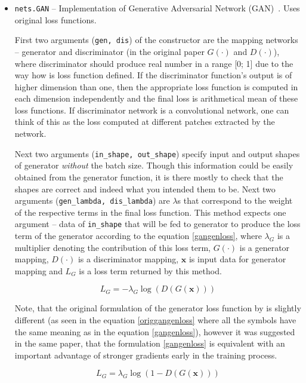 \begin{itemize}
\item \texttt{nets.GAN} -- Implementation of Generative Adversarial Network (GAN)~\cite{origgan}. Uses original loss functions.

\begin{description}
 First two arguments (\texttt{gen, dis}) of the constructor are the mapping networks -- generator and discriminator (in the original paper $G(\cdot)$ and $D(\cdot)$), where discriminator should produce real number in a range [0; 1] due to the way how is loss function defined. If the discriminator function's output is of higher dimension than one, then the appropriate loss function is computed in each dimension independently and the final loss is arithmetical mean of these loss functions. If discriminator network is a convolutional network, one can think of this as the loss computed at different patches extracted by the network.

Next two arguments (\texttt{in\_shape, out\_shape}) specify input and output shapes of generator {\em without} the batch size. Though this information could be easily obtained from the generator function, it is there mostly to check that the shapes are correct and indeed what you intended them to be. Next two arguments (\texttt{gen\_lambda, dis\_lambda}) are $\lambda$s that correspond to the weight of the respective terms in the final loss function.
 This method expects one argument -- data of \texttt{in\_shape} that will be fed to generator to produce the loss term of the generator according to the equation \ref{gangenloss}, where $\lambda_G$ is a multiplier denoting the contribution of this loss term, $G(\cdot)$ is a generator mapping, $D(\cdot)$ is a discriminator mapping, $\bm{x}$ is input data for generator mapping and $L_{G}$ is a loss term returned by this method.

\begin{equation}
L_{G} = -\lambda_G\log(D(G(\bm{x})))
\label{gangenloss}
\end{equation}

Note, that the original formulation of the generator loss function by \cite{origgan} is slightly different (as seen in the equation \ref{origgangenloss} where all the symbols have the same meaning as in the equation \ref{gangenloss}), however it was suggested in the same paper, that the formulation \ref{gangenloss} is equivalent with an important advantage of stronger gradients early in the training process.

\begin{equation}
L_{G} = \lambda_G\log(1 - D(G(\bm{x})))
\label{origgangenloss}
\end{equation}


\end{description}
\end{itemize}
